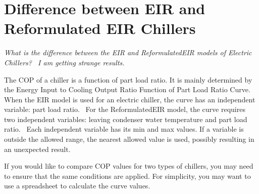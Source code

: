 \section{Difference between EIR and Reformulated EIR Chillers}\label{difference-between-eir-and-reformulated-eir-chillers}

\emph{What is the difference between the EIR and ReformulatedEIR models of Electric Chillers?~ I am getting strange results.}

The COP of a chiller is a function of part load ratio. It is mainly determined by the Energy Input to Cooling Output Ratio Function of Part Load Ratio Curve.~ When the EIR model is used for an electric chiller, the curve has an independent variable: part load ratio.~ For the ReformulatedEIR model, the curve requires two independent variables: leaving condenser water temperature and part load ratio.~ Each independent variable has its min and max values. If a variable is outside the allowed range, the nearest allowed value is used, possibly resulting in an unexpected result.

If you would like to compare COP values for two types of chillers, you may need to ensure that the same conditions are applied. For simplicity, you may want to use a spreadsheet to calculate the curve values.
